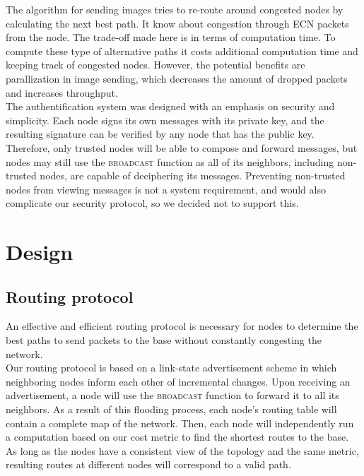 \documentclass[letterpaper]{article}
\begin{document}
\noindent The algorithm for sending images tries to re-route around congested nodes by 
calculating the next best path. It know about congestion through ECN packets from the node. The trade-off made
here is in terms of computation time. To compute these type of alternative paths it costs additional computation
time and keeping track of congested nodes. However, the potential benefits are parallization in image sending, 
which decreases the amount of dropped packets and increases throughput.
\\

\noindent The authentification system was designed with an emphasis on security and simplicity.
Each node signs its own messages with its private key, and the resulting signature can be verified by any
node that has the public key. Therefore, only trusted nodes will be able to compose and forward messages, but
nodes may still use the \textsc{broadcast} function as all of its neighbors, including non-trusted nodes, are
capable of deciphering its messages. Preventing non-trusted nodes from viewing messages is not a system 
requirement, and would also complicate our security protocol, so we decided not to support this.

\section{Design}

\subsection{Routing protocol}

An effective and efficient routing protocol is necessary for nodes to determine the best paths to send
packets to the base without constantly congesting the network.
\\

\noindent Our routing protocol is based on a link-state advertisement scheme in which neighboring nodes 
inform each other of incremental changes. Upon receiving an advertisement, a node will use the 
\textsc{broadcast} function to forward it to all its neighbors. As a result of this flooding process,
each node's routing table will contain a complete map of the network. Then, each node will independently
run a computation based on our cost metric to find the shortest routes to the base. As long as the nodes
have a consistent view of the topology and the same metric, resulting routes at different nodes will
correspond to a valid path.
\end{document}

